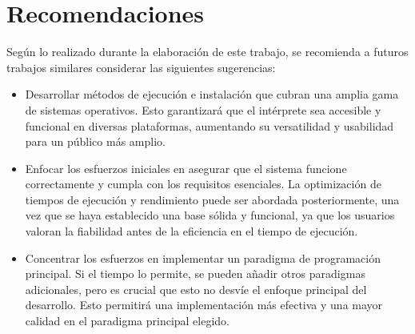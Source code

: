 \section{Recomendaciones}
Según lo realizado durante la elaboración de este trabajo, se recomienda a futuros trabajos similares considerar las siguientes sugerencias:
\begin{itemize}
  \item Desarrollar métodos de ejecución e instalación que cubran una amplia gama de sistemas operativos. Esto garantizará que el intérprete sea accesible y funcional en diversas plataformas, aumentando su versatilidad y usabilidad para un público más amplio.
  \item Enfocar los esfuerzos iniciales en asegurar que el sistema funcione correctamente y cumpla con los requisitos esenciales. La optimización de tiempos de ejecución y rendimiento puede ser abordada posteriormente, una vez que se haya establecido una base sólida y funcional, ya que los usuarios valoran la fiabilidad antes de la eficiencia en el tiempo de ejecución.
  \item Concentrar los esfuerzos en implementar un paradigma de programación principal. Si el tiempo lo permite, se pueden añadir otros paradigmas adicionales, pero es crucial que esto no desvíe el enfoque principal del desarrollo. Esto permitirá una implementación más efectiva y una mayor calidad en el paradigma principal elegido.
\end{itemize}